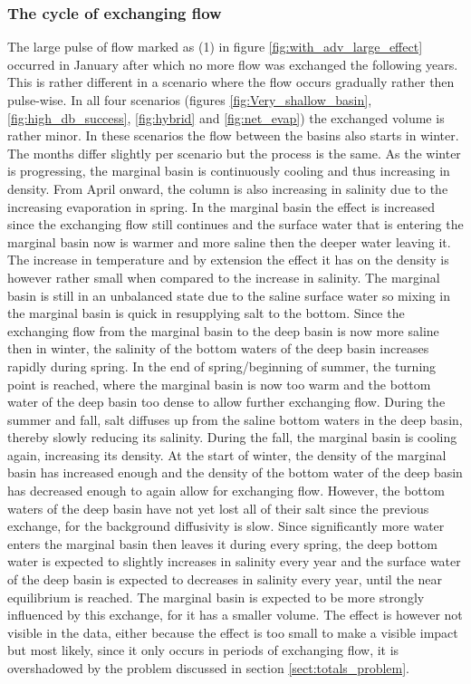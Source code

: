 \documentclass[twocolumn]{article}
\begin{document}
\subsubsection{The cycle of exchanging flow}
\label{sect:flow_cycle}
The large pulse of flow marked as (1) in figure \ref{fig:with_adv_large_effect} occurred in January after which no more flow was exchanged the following years. This is rather different in a scenario where the flow occurs gradually rather then pulse-wise. In all four scenarios (figures \ref{fig:Very_shallow_basin}, \ref{fig:high_db_success}, \ref{fig:hybrid} and \ref{fig:net_evap}) the exchanged volume is rather minor. In these scenarios the flow between the basins also starts in winter. The months differ slightly per scenario but the process is the same. As the winter is progressing, the marginal basin is continuously cooling and thus increasing in density. From April onward, the column is also increasing in salinity due to the increasing evaporation in spring. In the marginal basin the effect is increased since the exchanging flow still continues and the surface water that is entering the marginal basin now is warmer and more saline then the deeper water leaving it. The increase in temperature and by extension the effect it has on the density is however rather small when compared to the increase in salinity. The marginal basin is still in an unbalanced state due to the saline surface water so mixing in the marginal basin is quick in resupplying salt to the bottom. Since the exchanging flow from the marginal basin to the deep basin is now more saline then in winter, the salinity of the bottom waters of the deep basin increases rapidly during spring. In the end of spring/beginning of summer, the turning point is reached, where the marginal basin is now too warm and the bottom water of the deep basin too dense to allow further exchanging flow. 
During the summer and fall, salt diffuses up from the saline bottom waters in the deep basin, thereby slowly reducing its salinity. During the fall, the marginal basin is cooling again, increasing its density. At the start of winter, the density of the marginal basin has increased enough and the density of the bottom water of the deep basin has decreased enough to again allow for exchanging flow. However, the bottom waters of the deep basin have not yet lost all of their salt since the previous exchange, for the background diffusivity is slow. Since significantly more water enters the marginal basin then leaves it during every spring, the deep bottom water is expected to slightly increases in salinity every year and the surface water of the deep basin is expected to decreases in salinity every year, until the near equilibrium is reached. The marginal basin is expected to be more strongly influenced by this exchange, for it has a smaller volume. The effect is however not visible in the data, either because the effect is too small to make a visible impact but most likely, since it only occurs in periods of exchanging flow, it is overshadowed by the problem discussed in section \ref{sect:totals_problem}.
\end{document}
